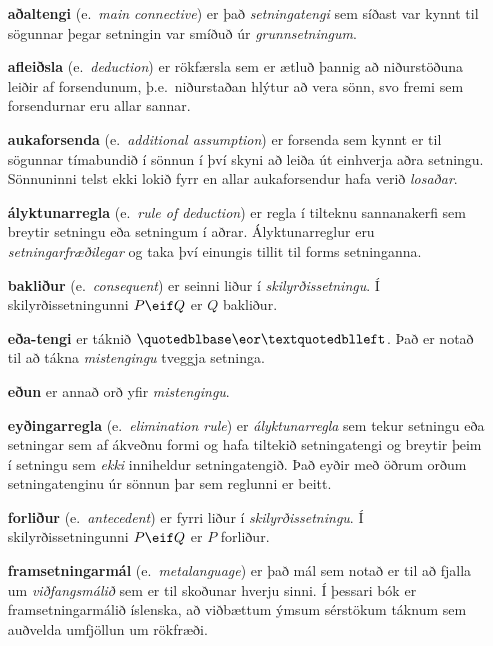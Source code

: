 \begin{enumerate}[leftmargin=35pt]
	
	\item[\textbf{aðaltengi}] (e.\ \emph{main connective}) er það \emph{setningatengi} sem síðast var kynnt til sögunnar þegar setningin var smíðuð úr \emph{grunnsetningum}.
	
	\item[\textbf{afleiðsla}] (e.\ \emph{deduction}) er rökfærsla sem er ætluð þannig að niðurstöðuna leiðir af forsendunum, þ.e.\ niðurstaðan hlýtur að vera sönn, svo fremi sem forsendurnar eru allar sannar.
			
	\item[\textbf{aukaforsenda}] (e.\ \emph{additional assumption}) er forsenda sem kynnt er til sögunnar tímabundið í sönnun í því skyni að leiða út einhverja aðra setningu. Sönnuninni telst ekki lokið fyrr en allar aukaforsendur hafa verið \emph{losaðar}.
				
	\item[\textbf{ályktunarregla}] (e.\ \emph{rule of deduction}) er regla í tilteknu sannanakerfi sem breytir setningu eða setningum í aðrar. Ályktunarreglur eru \emph{setningarfræðilegar} og taka því einungis tillit til forms setninganna.	
			
	\item[\textbf{bakliður}] (e.\ \emph{consequent}) er seinni liður í \emph{skilyrðissetningu}. Í skilyrðissetningunni $P \eif Q$ er $Q$ bakliður.
	
	\item[\textbf{eða-tengi}] er táknið $„\eor“$. Það er notað til að tákna \emph{mistengingu} tveggja setninga.
			
	\item[\textbf{eðun}] er annað orð yfir \emph{mistengingu}.
	
	\item[\textbf{eyðingarregla}] (e.\ \emph{elimination rule}) er \emph{ályktunarregla} sem tekur setningu eða setningar sem af ákveðnu formi og hafa tiltekið setningatengi og breytir þeim í setningu sem \emph{ekki} inniheldur setningatengið. Það eyðir með öðrum orðum setningatenginu úr sönnun þar sem reglunni er beitt.
	
	\item[\textbf{forliður}] (e.\ \emph{antecedent}) er fyrri liður í \emph{skilyrðissetningu}. Í skilyrðissetningunni $P \eif Q$ er $P$ forliður.
	
	\item[\textbf{framsetningarmál}] (e.\ \emph{metalanguage}) er það mál sem notað er til að fjalla um \emph{viðfangsmálið} sem er til skoðunar hverju sinni. Í þessari bók er framsetningarmálið íslenska, að viðbættum ýmsum sérstökum táknum sem auðvelda umfjöllun um rökfræði.
	

\end{enumerate}
